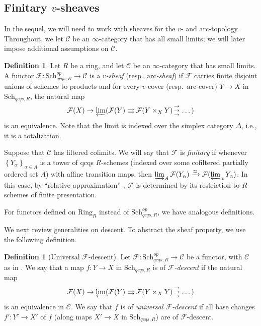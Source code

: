 \documentclass[reqno]{amsart}
\newcommand{\triplearrows}{\begin{smallmatrix} \to \\ \to \\ 
\to \end{smallmatrix} }
\newcommand{\arc}{\mathrm{arc}}
\theoremstyle{definition}
\newtheorem{definition}[theorem]{Definition}
\begin{document}
\subsection{Finitary $v$-sheaves}
\label{Finvsheaf}

In the sequel, we will need to work with sheaves for the $v$- and
$\arc$-topology.
Throughout, we let $\mathcal{C}$ be an $\infty$-category that has all small
limits; we will later impose additional assumptions on $\mathcal{C}$. 
\begin{definition} 
\label{DefFinitary}
Let $R$ be a ring, and let $\mathcal{C}$ be an $\infty$-category that has
small limits. A functor $\mathcal{F}\colon  \mathrm{Sch}_{qcqs,R}^{op} \to \mathcal{C}$ is
 a \emph{$v$-sheaf} (resp.~\emph{$\arc$-sheaf}) if $\mathcal{F}$
carries finite disjoint unions of schemes to products and for every $v$-cover
(resp.~$\arc$-cover) $Y \to X$ in $\mathrm{Sch}_{qcqs,R}$, the natural map  
\[\mathcal{F}(X) \to \varprojlim( \mathcal{F}(Y) \rightrightarrows \mathcal{F}(Y \times_X Y) \triplearrows \dots )\]
is an equivalence.
Note that the limit is indexed over the simplex category $\Delta$, i.e., it 
is a totalization. 

Suppose that $\mathcal{C}$ has filtered colimits.  We will say that
$\mathcal{F}$ is \emph{finitary} if whenever $\left\{Y_\alpha\right\}_{\alpha
\in A}$ is a tower of qcqs $R$-schemes (indexed over some cofiltered partially
ordered set $A$) with affine transition maps, then $
\varinjlim_{A} \mathcal{F}(Y_\alpha) \xrightarrow{\simeq}
\mathcal{F}( \varprojlim_\alpha
Y_\alpha) $. In this case, by ``relative approximation'' \cite[Tag 09MU]{stacks-project}, $\mathcal{F}$ is determined by its restriction to $R$-schemes of finite presentation. 

For functors defined on $\mathrm{Ring}_R$ instead of $\mathrm{Sch}_{qcqs,R}^{op}$, we have analogous definitions. 
\end{definition} 

We next review generalities on descent. 
To abstract the sheaf property, we use the following definition. 
\begin{definition}[Universal $\mathcal{F}$-descent] 
Let $\mathcal{F}\colon  \mathrm{Sch}_{qcqs,R}^{op} \to \mathcal{C}$ be a functor, with
$\mathcal{C}$ as in . 
We say that a map $f\colon  Y \to X $ in $\mathrm{Sch}_{qcqs,R}$ is of
\emph{$\mathcal{F}$-descent} if the
natural map
\[ \mathcal{F}(X) \to \varprojlim( \mathcal{F}(Y) \rightrightarrows \mathcal{F}(Y \times_{X}
Y) \triplearrows \dots )  \]
is an equivalence in $\mathcal{C}$. 
We say that $f$ is of \emph{universal $\mathcal{F}$-descent} if all base changes $f'\colon  Y' \to X'$ of $f$ (along maps $X' \to X$ in
$\mathrm{Sch}_{qcqs,R}$) are of $\mathcal{F}$-descent. 
\end{definition}  
\end{document}
